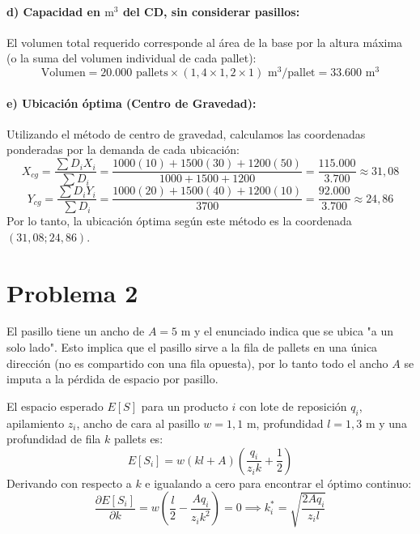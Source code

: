 \documentclass[11pt]{article}
\begin{document}
\paragraph{d) Capacidad en $\text{m}^3$ del CD, sin considerar pasillos:}
El volumen total requerido corresponde al área de la base por la altura máxima (o la suma del volumen individual de cada pallet):
$$ \text{Volumen} = 20.000 \text{ pallets} \times (1,4 \times 1,2 \times 1) \text{ m}^3\text{/pallet} = 33.600 \text{ m}^3 $$

\paragraph{e) Ubicación óptima (Centro de Gravedad):}
Utilizando el método de centro de gravedad, calculamos las coordenadas ponderadas por la demanda de cada ubicación:
$$ X_{cg} = \frac{\sum D_i X_i}{\sum D_i} = \frac{1000(10) + 1500(30) + 1200(50)}{1000 + 1500 + 1200} = \frac{115.000}{3.700} \approx 31,08 $$
$$ Y_{cg} = \frac{\sum D_i Y_i}{\sum D_i} = \frac{1000(20) + 1500(40) + 1200(10)}{3700} = \frac{92.000}{3.700} \approx 24,86 $$
Por lo tanto, la ubicación óptima según este método es la coordenada $(31,08; 24,86)$.


\section*{Problema 2}

El pasillo tiene un ancho de $A = 5 \text{ m}$ y el enunciado indica que se ubica "a un solo lado". Esto implica que el pasillo sirve a la fila de pallets en una única dirección (no es compartido con una fila opuesta), por lo tanto todo el ancho $A$ se imputa a la pérdida de espacio por pasillo.

El espacio esperado $E[S]$ para un producto $i$ con lote de reposición $q_i$, apilamiento $z_i$, ancho de cara al pasillo $w = 1,1 \text{ m}$, profundidad $l = 1,3 \text{ m}$ y una profundidad de fila $k$ pallets es:
$$ E[S_i] = w \left( k l + A \right) \left( \frac{q_i}{z_i k} + \frac{1}{2} \right) $$
Derivando con respecto a $k$ e igualando a cero para encontrar el óptimo continuo:
$$ \frac{\partial E[S_i]}{\partial k} = w \left( \frac{l}{2} - \frac{A q_i}{z_i k^2} \right) = 0 \implies k_i^* = \sqrt{\frac{2 A q_i}{z_i l}} $$
\end{document}

